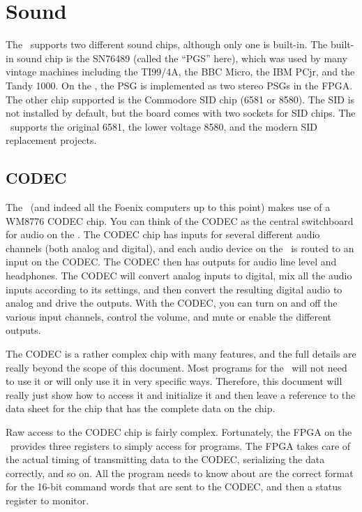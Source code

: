 \chapter{Sound}

The \jr\ supports two different sound chips, although only one is built-in. The built-in sound chip is the SN76489 (called the ``PGS'' here), which was used by many vintage machines including the TI99/4A, the BBC Micro, the IBM PCjr, and the Tandy 1000. On the \jr, the PSG is implemented as two stereo PSGs in the FPGA. The other chip supported is the Commodore SID chip (6581 or 8580). The SID is not installed by default, but the board comes with two sockets for SID chips. The \jr\ supports the original 6581, the lower voltage 8580, and the modern SID replacement projects.

\section{CODEC}

The \jr\ (and indeed all the Foenix computers up to this point) makes use of a WM8776 CODEC chip. You can think of the CODEC as the central switchboard for audio on the \jr. The CODEC chip has inputs for several different audio channels (both analog and digital), and each audio device on the \jr\ is routed to an input on the CODEC. The CODEC then has outputs for audio line level and headphones. The CODEC will convert analog inputs to digital, mix all the audio inputs according to its settings, and then convert the resulting digital audio to analog and drive the outputs. With the CODEC, you can turn on and off the various input channels, control the volume, and mute or enable the different outputs.

The CODEC is a rather complex chip with many features, and the full details are really beyond the scope of this document. Most programs for the \jr\ will not need to use it or will only use it in very specific ways. Therefore, this document will really just show how to access it and initialize it and then leave a reference to the data sheet for the chip that has the complete data on the chip.

Raw access to the CODEC chip is fairly complex. Fortunately, the FPGA on the \jr\ provides three registers to simply access for programs. The FPGA takes care of the actual timing of transmitting data to the CODEC, serializing the data correctly, and so on. All the program needs to know about are the correct format for the 16-bit command words that are sent to the CODEC, and then a status register to monitor.

